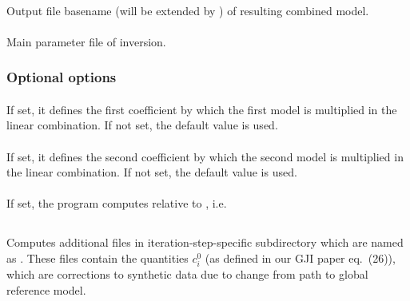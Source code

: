 \paragraph{}
Output file basename (will be extended by ) of resulting combined model.
\paragraph{}
Main parameter file of inversion.
\subsubsection{Optional options}
\paragraph{ }
If set, it defines the first coefficient  by which the first model is multiplied in the linear 
combination. If not set, the default value  is used.
\paragraph{ }
If set, it defines the second coefficient  by which the second model is multiplied in the linear 
combination. If not set, the default value  is used.
\paragraph{}
If set, the program computes relative to , i.e.\ \\
%
%
\subsection{} \label{programs_scripts,sec:bin_prog,sec:comp_correct_syn_data}
Computes additional files in iteration-step-specific subdirectory  which are named as
. These files contain the quantities $c_i^0$ (as defined in our GJI paper
eq.\ (26)), which are corrections to synthetic data due to change from path to global reference model.
